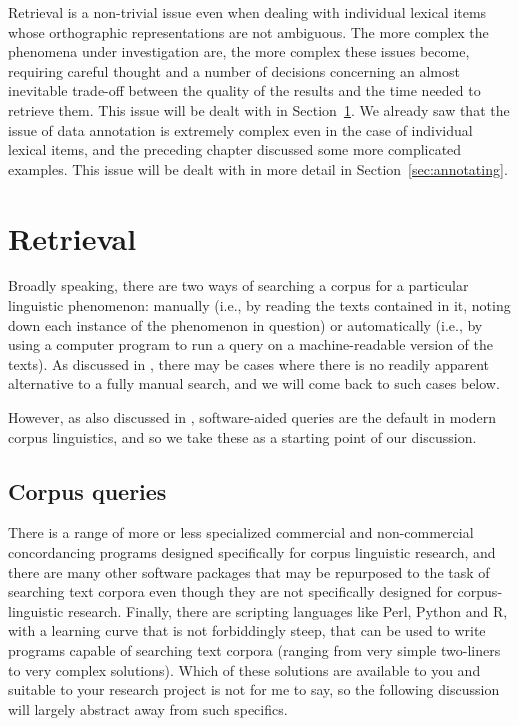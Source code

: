 Retrieval is a non\hyp{}trivial issue even when dealing with individual lexical items whose orthographic representations are not ambiguous.  The more complex  the phenomena under investigation are, the more complex these issues become, requiring careful thought and a number of decisions concerning an almost inevitable trade\hyp{}off between the quality of the results and the time needed to retrieve  them. This issue will be dealt with in Section~\ref{sec:retrieval}. We already saw that the issue of data annotation  is extremely complex even in the case of individual lexical items, and the preceding chapter discussed some more complicated examples. This issue will be dealt with in more detail in Section~\ref{sec:annotating}.

\section{Retrieval}
\label{sec:retrieval}

Broadly speaking, there are two ways of searching a corpus for a particular linguistic phenomenon: manually  (i.e., by reading the texts contained in it, noting down each instance of the phenomenon in question) or automatically (i.e., by using a computer program to run a query  on a machine\hyp{}readable version of the texts). As discussed in , there may be cases where there is no readily apparent alternative to a fully manual  search, and we will come back to such cases below.

However, as also discussed in , software\hyp{}aided queries  are the default in modern corpus linguistics, and so we take these as a starting point of our discussion.

\subsection{Corpus queries}
\label{sec:corpusqueries}

There is a range of more or less specialized commercial and non\hyp{}commercial concordancing  programs designed specifically for corpus linguistic research, and there are many other software packages that may be repurposed to the task of searching text corpora even though they are not specifically designed for corpus\hyp{}linguistic research. Finally, there are scripting languages like Perl, Python and R, with a learning curve that is not forbiddingly steep, that can be used to write programs capable of searching text corpora (ranging from very simple two\hyp{}liners to very complex solutions). Which of these solutions are available to you and suitable to your research project is not for me to say, so the following discussion will largely abstract away from such specifics.


